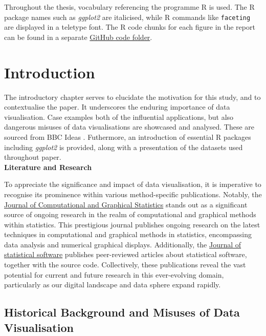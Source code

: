\documentclass{article}\usepackage[]{graphicx}\usepackage[]{xcolor}
\numberwithin{equation}{section}
\begin{document}
\noindent
Throughout the thesis, vocabulary referencing the programme R is used. The R package names such as \textit{ggplot2} are italicised, while R commands like \texttt{faceting} are displayed in a teletype font. The R code chunks for each figure in the report can be found in a separate \href{https://github.com/Qinqing-Li/Data-Visualisation-Project/tree/main/code}{GitHub code folder}. \\


\newpage 

\section{Introduction}

\noindent
The introductory chapter serves to elucidate the motivation for this study, and to contextualise the paper. It underscores the enduring importance of data visualisation. Case examples both of the influential applications, but also dangerous misuses of data visualisations are showcased and analysed. These are sourced from BBC Ideas \cite{bbcdatavis}. Futhermore, an introduction of essential R packages including \textit{ggplot2} is provided, along with a presentation of the datasets used throughout paper.\\

\noindent \textbf{Literature and Research} 

\noindent
To appreciate the significance and impact of data visualisation, it is imperative to recognise its prominence within various method-specific publications. Notably, the \href{https://www.tandfonline.com/journals/ucgs20}{Journal of Computational and Graphical Statistics} stands out as a significant source of ongoing research in the realm of computational and graphical methods within statistics. This prestigious journal publishes ongoing research on the latest techniques in computational and graphical methods in statistics, encompassing data analysis and numerical graphical displays. Additionally, the \href{https://www.jstatsoft.org/index}{Journal of statistical software} publishes peer-reviewed articles about statistical software, together with the source code. Collectively, these publications reveal the vast potential for current and future research in this ever-evolving domain, particularly as our digital landscape and data sphere expand rapidly.

\subsection{Historical Background and Misuses of Data Visualisation}
\end{document}
